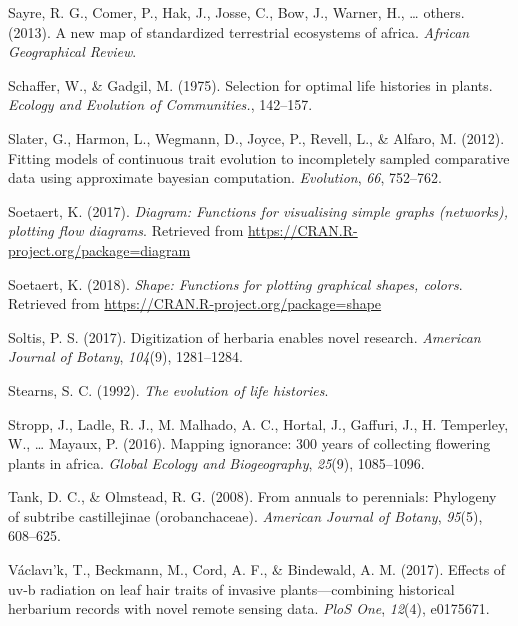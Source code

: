 \documentclass[man,floatsintext]{apa6}
\theoremstyle{definition}
\theoremstyle{definition}
\theoremstyle{definition}
\theoremstyle{remark}
\begin{document}
\leavevmode\hypertarget{ref-sayre2013new}{}%
Sayre, R. G., Comer, P., Hak, J., Josse, C., Bow, J., Warner, H.,
\ldots{} others. (2013). A new map of standardized terrestrial
ecosystems of africa. \emph{African Geographical Review}.

\leavevmode\hypertarget{ref-schaffer1975selection}{}%
Schaffer, W., \& Gadgil, M. (1975). Selection for optimal life histories
in plants. \emph{Ecology and Evolution of Communities.}, 142--157.

\leavevmode\hypertarget{ref-R-geiger_c}{}%
Slater, G., Harmon, L., Wegmann, D., Joyce, P., Revell, L., \& Alfaro,
M. (2012). Fitting models of continuous trait evolution to incompletely
sampled comparative data using approximate bayesian computation.
\emph{Evolution}, \emph{66}, 752--762.

\leavevmode\hypertarget{ref-R-diagram}{}%
Soetaert, K. (2017). \emph{Diagram: Functions for visualising simple
graphs (networks), plotting flow diagrams}. Retrieved from
\url{https://CRAN.R-project.org/package=diagram}

\leavevmode\hypertarget{ref-R-shape}{}%
Soetaert, K. (2018). \emph{Shape: Functions for plotting graphical
shapes, colors}. Retrieved from
\url{https://CRAN.R-project.org/package=shape}

\leavevmode\hypertarget{ref-soltis2017digitization}{}%
Soltis, P. S. (2017). Digitization of herbaria enables novel research.
\emph{American Journal of Botany}, \emph{104}(9), 1281--1284.

\leavevmode\hypertarget{ref-stearns1992evolution}{}%
Stearns, S. C. (1992). \emph{The evolution of life histories}.

\leavevmode\hypertarget{ref-stropp2016mapping}{}%
Stropp, J., Ladle, R. J., M. Malhado, A. C., Hortal, J., Gaffuri, J., H.
Temperley, W., \ldots{} Mayaux, P. (2016). Mapping ignorance: 300 years
of collecting flowering plants in africa. \emph{Global Ecology and
Biogeography}, \emph{25}(9), 1085--1096.

\leavevmode\hypertarget{ref-tank2008annuals}{}%
Tank, D. C., \& Olmstead, R. G. (2008). From annuals to perennials:
Phylogeny of subtribe castillejinae (orobanchaceae). \emph{American
Journal of Botany}, \emph{95}(5), 608--625.

\leavevmode\hypertarget{ref-vaclavik2017effects}{}%
Václavı'k, T., Beckmann, M., Cord, A. F., \& Bindewald, A. M. (2017).
Effects of uv-b radiation on leaf hair traits of invasive
plants---combining historical herbarium records with novel remote
sensing data. \emph{PloS One}, \emph{12}(4), e0175671.
\end{document}
